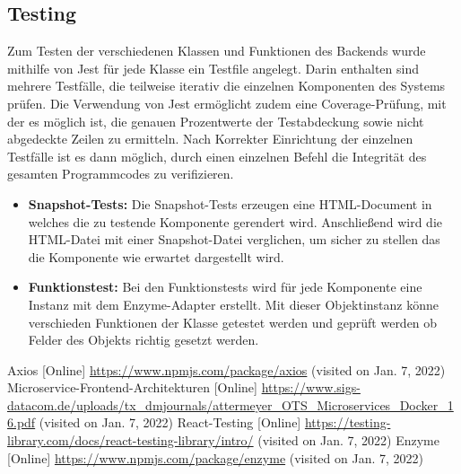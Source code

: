 \documentclass[conference]{IEEEtran}
\begin{document}
\subsection{Testing}
Zum Testen der verschiedenen Klassen und Funktionen des Backends wurde mithilfe von Jest für jede Klasse ein Testfile angelegt. Darin enthalten sind mehrere Testfälle, die teilweise iterativ die einzelnen Komponenten des Systems prüfen. Die Verwendung von Jest ermöglicht zudem eine Coverage-Prüfung, mit der es möglich ist, die genauen Prozentwerte der Testabdeckung sowie nicht abgedeckte Zeilen zu ermitteln. Nach Korrekter Einrichtung der einzelnen Testfälle ist es dann möglich, durch einen einzelnen Befehl die Integrität des gesamten Programmcodes zu verifizieren.

\begin{itemize}
    \item \textbf{Snapshot-Tests:}
    Die Snapshot-Tests erzeugen eine HTML-Document in welches die zu testende Komponente gerendert wird.
    Anschließend wird die HTML-Datei mit einer Snapshot-Datei verglichen, um sicher zu stellen das die Komponente wie erwartet dargestellt wird.
    \item \textbf{Funktionstest:}
    Bei den Funktionstests wird für jede Komponente eine Instanz mit dem Enzyme-Adapter erstellt.
    Mit dieser Objektinstanz könne verschieden Funktionen der Klasse getestet werden und geprüft werden ob Felder des Objekts richtig gesetzt werden.
\end{itemize}



\begin{thebibliography}{0}
	Axios [Online] \url{https://www.npmjs.com/package/axios} (visited on Jan. 7, 2022)
    Microservice-Frontend-Architekturen [Online] \url{https://www.sigs-datacom.de/uploads/tx_dmjournals/attermeyer_OTS_Microservices_Docker_16.pdf} (visited on Jan. 7, 2022)
    React-Testing [Online] \url{https://testing-library.com/docs/react-testing-library/intro/} (visited on Jan. 7, 2022)
    Enzyme [Online] \url{https://www.npmjs.com/package/enzyme} (visited on Jan. 7, 2022)  
\end{thebibliography}
\end{document}
